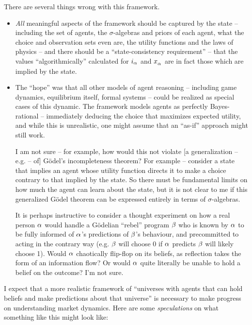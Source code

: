 \documentclass{article}
\begin{document}
There are several things wrong with this framework.

\begin{itemize}

    \item \emph{All} meaningful aspects of the framework should be captured by the state -- including the set of agents, the $\sigma$-algebras and priors of each agent, what the choice and observation sets even are, the utility functions and the laws of physics -- and there should be a ``state-consistency requirement'' -- that the values ``algorithmically'' calculated for $\obs[\agent]$ and $\choice[\agent]$ are in fact those which are implied by the state.

    \item The ``hope'' was that all other models of agent reasoning -- including game dynamics, equilibrium itself, formal systems -- could be realized as special cases of this dynamic. The framework models agents as perfectly Bayes-rational -- immediately deducing the choice that maximizes expected utility, and while this is unrealistic, one might assume that an ``as-if'' approach might still work.
    
    I am not sure -- for example, how would this not violate [a generalization -- e.g. \cite{Charlesworth2014} -- of] G\"odel's incompleteness theorem? For example -- consider a state that implies an agent whose utility function directs it to make a choice contrary to that implied by the state. So there must be fundamental limits on how much the agent can learn about the state, but it is not clear to me if this generalized G\"odel theorem can be expressed entirely in terms of $\sigma$-algebras.

    It is perhaps instructive to consider a thought experiment on how a real person $\agent$ would handle a G\"odelian ``rebel'' program $\agentb$ who is known by $\agent$ to be fully informed of $\agent$'s predictions of $\agentb$'s behaviour, and precommitted to acting in the contrary way (e.g. $\agentb$ will choose 0 if $\agent$ predicts $\agentb$ will likely choose 1). Would $\agent$ chaotically flip-flop on its beliefs, as reflection takes the form of an information flow? Or would $\agent$ quite literally be unable to hold a belief on the outcome? I'm not sure.

\end{itemize}

I expect that a more realistic framework of ``universes with agents that can hold beliefs and make predictions about that universe'' is necessary to make progress on understanding market dynamics. Here are some \emph{speculations} on what something like this might look like:
\end{document}
